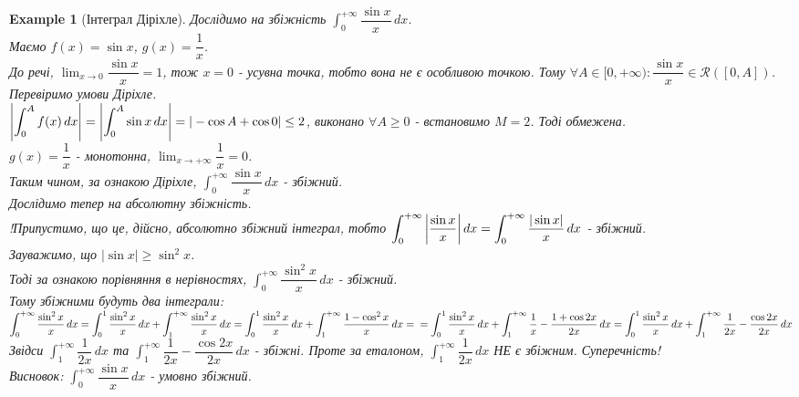 \documentclass[a4paper, 10pt]{article}
\def\huge{\displaystyle}
\def\bigline{\vspace{5mm}\\}
\theoremstyle{theoremdd}
\theoremstyle{theoremdd}
\theoremstyle{theoremdd}
\theoremstyle{theoremdd}
\newtheorem{example}[theorem]{Example}
\theoremstyle{theoremdd}
\theoremstyle{theoremdd}
\theoremstyle{theoremdd}
\theoremstyle{theoremdd}
\begin{document}
\begin{example}[Інтеграл Діріхле]
Дослідимо на збіжність $\huge\int_0^{+\infty} \dfrac{\sin x}{x}\,dx$.\\
Маємо $f(x) = \sin x$, $g(x) = \dfrac{1}{x}$.\\
До речі, $\huge\lim_{x \to 0} \dfrac{\sin x}{x} = 1$, тож $x = 0$ - усувна точка, тобто вона не є особливою точкою. Тому $\forall A \in [0,+\infty): \dfrac{\sin x}{x} \in \mathcal{R}([0,A])$.\\
Перевіримо умови Діріхле.\\
$\abs{\huge\int_0^{A} f(x)\,dx} = \abs{\huge\int_0^A \sin x \,dx} = |-\cos A + \cos 0| \leq 2$, виконано $\forall A \geq 0$ - встановимо $M = 2$. Тоді обмежена.\\
$g(x) = \dfrac{1}{x}$ - монотонна, $\huge\lim_{x \to +\infty} \dfrac{1}{x} = 0$.\\
Таким чином, за ознакою Діріхле,  $\huge\int_0^{+\infty} \dfrac{\sin x}{x}\,dx$  - збіжний.
\bigline
Дослідимо тепер на абсолютну збіжність.\\
!Припустимо, що це, дійсно, абсолютно збіжний інтеграл, тобто
$\huge\int_0^{+\infty} \abs{\dfrac{\sin x}{x}}\,dx = \huge\int_0^{+\infty} \dfrac{|\sin x|}{x}\,dx$ - збіжний.\\
Зауважимо, що $|\sin x| \geq \sin^2 x$.\\
Тоді за ознакою порівняння в нерівностях, $\huge\int_0^{+\infty} \dfrac{\sin^2 x}{x}\,dx$ - збіжний.\\
Тому збіжними будуть два інтеграли:\\
$\huge\int_0^{+\infty} \dfrac{\sin^2 x}{x}\,dx = \huge\int_0^1 \dfrac{\sin^2 x}{x}\,dx + \huge\int_1^{+\infty} \dfrac{\sin^2 x}{x}\,dx =
\huge\int_0^1 \dfrac{\sin^2 x}{x}\,dx + \huge\int_1^{+\infty} \dfrac{1 - \cos^2 x}{x}\,dx = \\ = \huge\int_0^1 \dfrac{\sin^2 x}{x}\,dx + \huge\int_1^{+\infty} \dfrac{1}{x} - \dfrac{1+\cos 2x}{2x} \,dx = \huge\int_0^1 \dfrac{\sin^2 x}{x}\,dx + \huge\int_1^{+\infty} \dfrac{1}{2x} - \dfrac{\cos 2x}{2x} \,dx$\\
Звідси $\huge\int_1^{+\infty} \dfrac{1}{2x} \,dx$ та $\huge\int_1^{+\infty} \dfrac{1}{2x}-\dfrac{\cos 2x}{2x} \,dx$ - збіжні. Проте за еталоном, $\huge\int_1^{+\infty} \dfrac{1}{2x} \,dx$ НЕ є збіжним. Суперечність!\\
Висновок: $\huge\int_0^{+\infty} \dfrac{\sin x}{x}\,dx$ - умовно збіжний.
\end{example}
\end{document}
